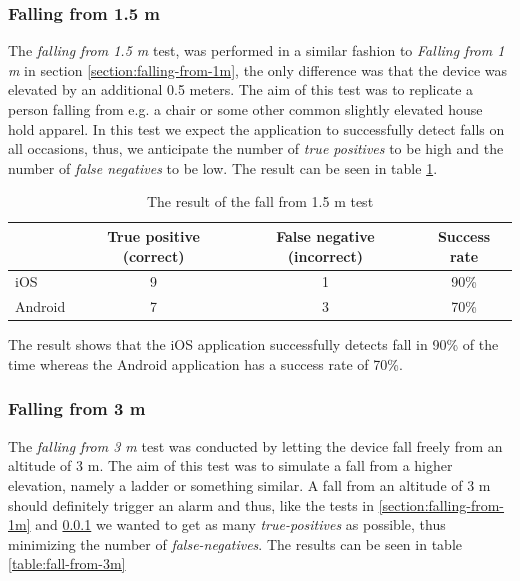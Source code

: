 \documentclass[12pt, a4paper, onecolumn]{article}
\begin{document}
	\subsubsection{Falling from 1.5 m}
	\label{section:falling-from-1.5m}
	The \textit{falling from 1.5 m} test, was performed in a similar fashion to \textit{Falling from 1 m} in section \ref{section:falling-from-1m}, the only difference was that the device was elevated by an additional 0.5 meters. The aim of this test was to replicate a person falling from e.g. a chair or some other common slightly elevated house hold apparel. In this test we expect the application to successfully detect falls on all occasions, thus, we anticipate the number of \textit{true positives} to be high and the number of \textit{false negatives} to be low. The result can be seen in table \ref{table:fall-from-1.5m}.
	
	\begin{table}[H]
		\centering
		\begin{tabular}{|l|c|c|c|}
			\hline
			& True positive (correct) & False negative (incorrect) & Success rate \\ \hline
			iOS     & 9            & 1             & 90\%        \\ \hline
			Android & 7            & 3              & 70\%        \\ \hline
		\end{tabular}
		\caption{The result of the fall from 1.5 m test}
		\label{table:fall-from-1.5m}
	\end{table}
	
	The result shows that the iOS application successfully detects fall in 90\% of the time whereas the Android application has a success rate of 70\%.
	
	
	\subsubsection{Falling from 3 m}
	The \textit{falling from 3 m} test was conducted by letting the device fall freely from an altitude of 3 m. The aim of this test was to simulate a fall from a higher elevation, namely a ladder or something similar. A fall from an altitude of 3 m should definitely trigger an alarm and thus, like the tests in \ref{section:falling-from-1m} and \ref{section:falling-from-1.5m} we wanted to get as many \textit{true-positives} as possible, thus minimizing the number of \textit{false-negatives}. The results can be seen in table \ref{table:fall-from-3m}
	
\end{document}
